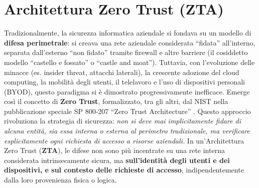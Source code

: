 \section{Architettura Zero Trust (ZTA)}
\label{sec:zero_trust}
Tradizionalmente, la sicurezza informatica aziendale si fondava su un modello di \textbf{difesa perimetrale}: si creava una rete aziendale considerata “fidata” all'interno, separata dall'esterno “non fidato” tramite firewall e altre barriere (il cosiddetto modello “castello e fossato” o \enquote{castle and moat}). Tuttavia, con l'evoluzione delle minacce (es. insider threat, attacchi laterali), la crescente adozione del cloud computing, la mobilità degli utenti, il telelavoro e l'uso di dispositivi personali (BYOD), questo paradigma si è dimostrato progressivamente inefficace. Emerge così il concetto di \textbf{Zero Trust}, formalizzato, tra gli altri, dal NIST nella pubblicazione speciale SP 800-207 \enquote{Zero Trust Architecture} \cite{nistZeroTrust}. Questo approccio rivoluziona la strategia di sicurezza: \textit{non si deve mai implicitamente fidare di alcuna entità, sia essa interna o esterna al perimetro tradizionale, ma verificare esplicitamente ogni richiesta di accesso a risorse aziendali.} In un'Architettura Zero Trust (\textbf{ZTA}), le difese non sono più incentrate su una rete interna considerata intrinsecamente sicura, ma \textbf{sull'identità degli utenti e dei dispositivi, e sul contesto delle richieste di accesso}, indipendentemente dalla loro provenienza fisica o logica.

